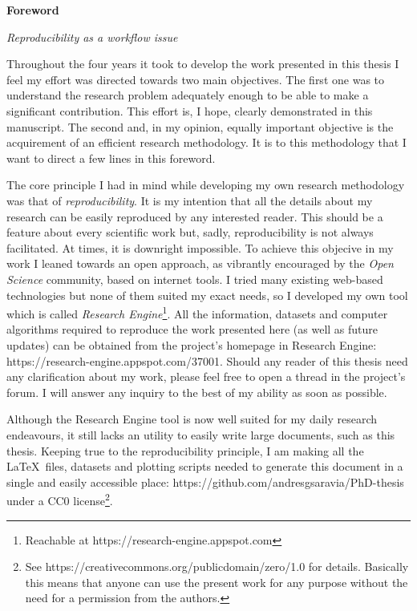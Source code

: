 
\cleardoublepage
{}
{}
\begin{center}
\textbf{\large Foreword}

\textit{Reproducibility as a workflow issue}
\end{center}

Throughout the four years it took to develop the work presented in this thesis I feel my effort was directed towards two main objectives.
The first one was to understand the research problem adequately enough to be able to make a significant contribution. 
This effort is, I hope, clearly demonstrated in this manuscript.
The second and, in my opinion, equally important objective is the acquirement of an efficient research methodology.
It is to this methodology that I want to direct a few lines in this foreword.

The core principle I had in mind while developing my own research methodology was that of \textit{reproducibility}.
It is my intention that all the details about my research can be easily reproduced by any interested reader.
This should be a feature about every scientific work but, sadly, reproducibility is not always facilitated.
At times, it is downright impossible.
To achieve this objecive in my work I leaned towards an open approach, as vibrantly encouraged by the \textit{Open Science} community, based on internet tools.
I tried many existing web-based technologies but none of them suited my exact needs, so I developed my own tool which is called \textit{Research Engine}\footnote{Reachable at https://research-engine.appspot.com}.
All the information, datasets and computer algorithms required to reproduce the work presented here (as well as future updates) can be obtained from the project's homepage in Research Engine: https://research-engine.appspot.com/37001. 
Should any reader of this thesis need any clarification about my work, please feel free to open a thread in the project's forum.
I will answer any inquiry to the best of my ability as soon as possible.

Although the Research Engine tool is now well suited for my daily research endeavours, it still lacks an utility to easily write large documents, such as this thesis.
Keeping true to the reproducibility principle, I am making all the \LaTeX\ files, datasets and plotting scripts needed to generate this document in a single and easily accessible place: https://github.com/andresgsaravia/PhD-thesis under a CC0 license\footnote{See https://creativecommons.org/publicdomain/zero/1.0 for details.
Basically this means that anyone can use the present work for any purpose without the need for a permission from the authors.}.
